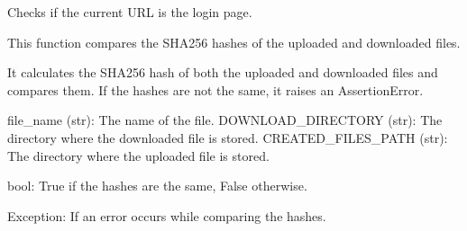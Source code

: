 \documentclass[letterpaper,10pt,english]{sphinxmanual}
\begin{document}

\begin{fulllineitems}
\label{\detokenize{utils:utils.file_management.check_url_login_page}}
\pysigstartsignatures
{}
\pysigstopsignatures
\sphinxAtStartPar
Checks if the current URL is the login page.

\end{fulllineitems}


\begin{fulllineitems}
\label{\detokenize{utils:utils.file_management.click_new_fileOrFolder}}
\pysigstartsignatures
{}
\pysigstopsignatures
\end{fulllineitems}


\begin{fulllineitems}
\label{\detokenize{utils:utils.file_management.compare_hashes}}
\pysigstartsignatures
{}
\pysigstopsignatures
\sphinxAtStartPar
This function compares the SHA\sphinxhyphen{}256 hashes of the uploaded and downloaded files.

\sphinxAtStartPar
It calculates the SHA\sphinxhyphen{}256 hash of both the uploaded and downloaded files and compares them. 
If the hashes are not the same, it raises an AssertionError.
\begin{description}
\sphinxAtStartPar
file\_name (str): The name of the file.
DOWNLOAD\_DIRECTORY (str): The directory where the downloaded file is stored.
CREATED\_FILES\_PATH (str): The directory where the uploaded file is stored.

\sphinxAtStartPar
bool: True if the hashes are the same, False otherwise.

\sphinxAtStartPar
Exception: If an error occurs while comparing the hashes.

\end{description}

\end{fulllineitems}
\end{document}
